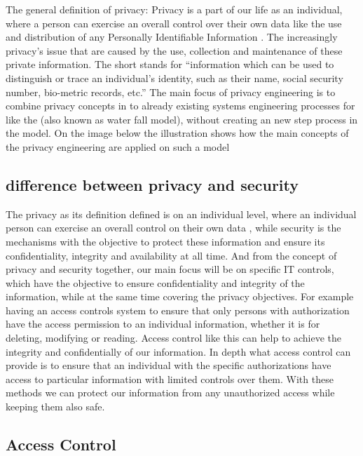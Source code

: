 \documentclass[conference]{IEEEtran}
\begin{document}
The general definition of privacy:
Privacy is a part of our life as an individual, where a person can exercise an overall control over their own data like the use and distribution of any Personally Identifiable Information . The increasingly privacy’s issue that are caused by the use, collection and maintenance of these private information.
\newline The short  stands for “information which can be used to distinguish or trace an individual’s identity, such as their name, social security number, bio-metric records, etc.”
\newline The main focus of privacy engineering is to combine privacy concepts in to already existing systems engineering processes for like the  (also known as water fall model), without creating an new step process in the model. On the image below the illustration shows how the main concepts of the privacy engineering are applied on such a model

\subsection{difference between privacy and security}\label{privacy and security}

The privacy as its definition defined is on an individual level, where an individual person can exercise an overall control on their own data , while security is the mechanisms with the objective to protect these information and ensure its confidentiality, integrity and availability at all time. And from the concept of privacy and security together, our main focus will be on specific IT controls, which have the objective to ensure confidentiality and integrity of the information, while at the same time covering the privacy objectives. For example having an access controls system to ensure that only persons with authorization have the access permission to an individual information, whether it is for deleting, modifying or reading. Access control like this can help to achieve the integrity and confidentially of our information. In depth what access control can provide is to ensure that an individual with the specific authorizations have access to particular information with limited controls over them. With these methods we can protect our information from any unauthorized access while keeping them also safe.


\subsection{Access Control}\label{access_control}
\end{document}
